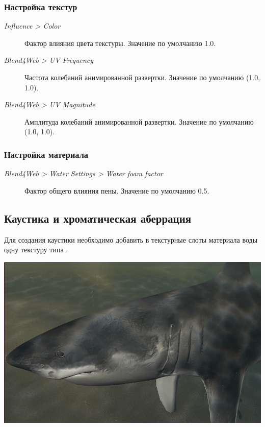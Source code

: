 \documentclass[a4paper,12pt,oneside]{sphinxmanual}
\begin{document}
\subsubsection{Настройка текстур}
\label{outdoor_rendering:id13}\begin{description}
\item[{\emph{Influence \textgreater{} Color}}] \leavevmode
Фактор влияния цвета текстуры. Значение по умолчанию 1.0.

\item[{\emph{Blend4Web \textgreater{} UV Frequency}}] \leavevmode
Частота колебаний анимированной развертки. Значение по умолчанию (1.0, 1.0).

\item[{\emph{Blend4Web \textgreater{} UV Magnitude}}] \leavevmode
Амплитуда колебаний анимированной развертки. Значение по умолчанию (1.0, 1.0).

\end{description}


\subsubsection{Настройка материала}
\label{outdoor_rendering:id14}\begin{description}
\item[{\emph{Blend4Web \textgreater{} Water Settings \textgreater{} Water foam factor}}] \leavevmode
Фактор общего влияния пены. Значение по умолчанию 0.5.

\end{description}


\subsection{Каустика и хроматическая аберрация}
\label{outdoor_rendering:id15}
Для создания каустики необходимо добавить в текстурные слоты материала воды одну текстуру типа .

{\hfill\includegraphics[width=1.000\linewidth]{water_caustics.jpg}\hfill}
\end{document}
